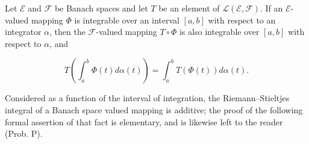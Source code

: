 Let $\mathcal{E}$ and $\mathcal{F}$ be Banach spaces and let $T$ be an element of $\mathcal{L}(\mathcal{E}, \mathcal{F})$. If an $\mathcal{E}$-valued mapping $\Phi$ is integrable over an interval $[a, b]$ with respect to an integrator $\alpha$, then the $\mathcal{F}$-valued mapping $T \circ \Phi$ is also integrable over $[a, b]$ with respect to $\alpha$, and

$$T \left( \int_a^b \Phi(t) d\alpha(t) \right) = \int_a^b T(\Phi(t)) d\alpha(t).$$

Considered as a function of the interval of integration, the Riemann–Stieltjes integral of a Banach space valued mapping is additive; the proof of the following formal assertion of that fact is elementary, and is likewise left to the reader (Prob. P).
